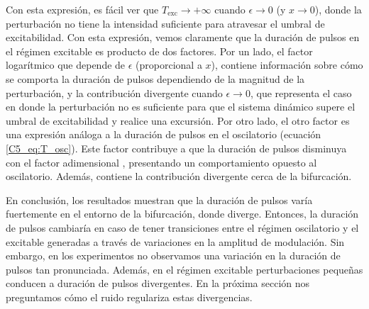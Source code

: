 \documentclass[./main.tex]{subfiles}
\begin{document}
Con esta expresión, es fácil ver que $T_{\text{exc}} \rightarrow +\infty$ cuando $\epsilon \rightarrow 0$ (y $x \rightarrow 0$), donde la perturbación no tiene la intensidad suficiente para atravesar el umbral de excitabilidad. Con esta expresión, vemos claramente que la duración de pulsos en el régimen excitable es producto de dos factores. Por un lado, el factor logarítmico que depende de $\epsilon$ (proporcional a $x$), contiene información sobre cómo se comporta la duración de pulsos dependiendo de la magnitud de la perturbación, y la contribución divergente cuando $\epsilon \rightarrow 0$, que representa el caso en donde la perturbación no es suficiente para que el sistema dinámico supere el umbral de excitabilidad y realice una excursión. Por otro lado, el otro factor es una expresión análoga a la duración de pulsos en el oscilatorio (ecuación \ref{C5_eq:T_osc}). Este factor contribuye a que la duración de pulsos disminuya con el factor adimensional \dddelta, presentando un comportamiento opuesto al oscilatorio. Además, contiene la contribución divergente cerca de la bifurcación. 

En conclusión, los resultados muestran que la duración de pulsos varía fuertemente en el entorno de la bifurcación, donde diverge. Entonces, la duración de pulsos cambiaría en caso de tener transiciones entre el régimen oscilatorio y el excitable generadas a través de variaciones en la amplitud de modulación. Sin embargo, en los experimentos no observamos una variación en la duración de pulsos tan pronunciada. Además, en el régimen excitable perturbaciones pequeñas conducen a duración de pulsos divergentes. En la próxima sección nos preguntamos cómo el ruido regulariza estas divergencias.
\end{document}
